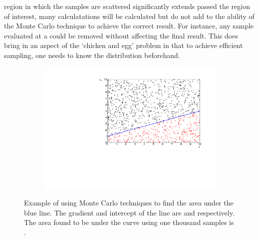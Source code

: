 region in which the samples are scattered significantly extends passed the region of interest, many calculatations will be calculated but do not add to the ability of the Monte Carlo technique to achieve the correct result. For instance, any sample evaluated at a  could be removed without affecting the final result. This does bring in an aspect of the `chicken and egg' problem in that to achieve efficient sampling, one needs to know the distribution beforehand.

\begin{figure}[h]
  \begin{subfigure}[t]{0.80\textwidth}
    \includegraphics[width=\textwidth, trim={0mm 0mm 0mm 0mm}, clip,page=1]{Figures/MCMC/MCTechnique.pdf}
  \end{subfigure}
  \caption{Example of using Monte Carlo techniques to find the area under the blue line. The gradient and intercept of the line are  and  respectively. The area found to be under the curve using one thousand samples is .}
  \label{fig:MCMC_MCTechnique}
\end{figure}

